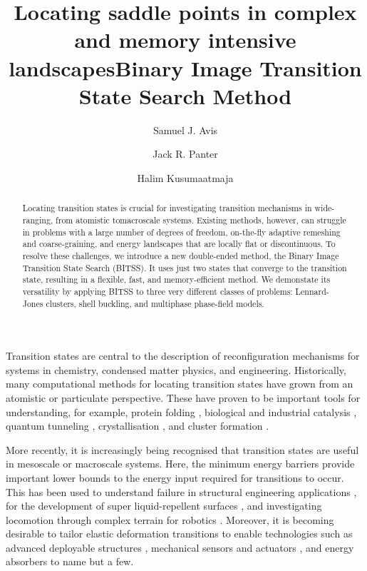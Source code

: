\documentclass[aps,prl,twocolumn,10pt,groupedaddress]{revtex4-2}
\begin{document}
\title{Locating saddle points in complex and memory intensive landscapes}
\title{Binary Image Transition State Search Method}
\author{Samuel J. Avis}
\author{Jack R. Panter}
\author{Halim Kusumaatmaja}

\begin{abstract}
  Locating transition states is crucial for investigating transition mechanisms in wide-ranging, from atomistic tomacroscale systems.
  Existing methods, however, can struggle in problems with a large number of degrees of freedom, on-the-fly adaptive remeshing and coarse-graining, and energy landscapes that are locally flat or discontinuous.
  To resolve these challenges, we introduce a new double-ended method, the Binary Image Transition State Search (BITSS).
  It uses just two states that converge to the transition state, resulting in a flexible, fast, and memory-efficient method.
  We demonstate its versatility by applying BITSS to three very different classes of problems: Lennard-Jones clusters, shell buckling, and multiphase phase-field models.
\end{abstract}

\maketitle


Transition states are central to the description of reconfiguration mechanisms for systems in chemistry, condensed matter physics, and engineering.
Historically, many computational methods for locating transition states have grown from an atomistic or particulate perspective.
These have proven to be important tools for understanding, for example, protein folding \cite{Bryngelson1995,Onuchic1997}, biological and industrial catalysis \cite{Boehr2006,Kerns2015,Guo2018a}, quantum tunneling \cite{Richardson2016,Vaillant2019}, crystallisation \cite{Richard2018}, and cluster formation \cite{Wales1998,Wales2012}.

More recently, it is increasingly being recognised that transition states are useful in mesoscale or macroscale systems.
Here, the minimum energy barriers provide important lower bounds to the energy input required for transitions to occur.
This has been used to understand failure in structural engineering applications \cite{Panter2019,Hutchinson2018}, for the development of super liquid-repellent surfaces \cite{Zhang2014,Panter2019b}, and investigating locomotion through complex terrain for robotics \cite{Othayoth2020}.
Moreover, it is becoming desirable to tailor elastic deformation transitions to enable technologies such as advanced deployable structures \cite{Filipov2015,Zhai2018}, mechanical sensors and actuators \cite{Bertoldi2017,Truby2016,Chi2022,Bonfanti2020}, and energy absorbers \cite{Shan2015,Giri2021} to name but a few.
\end{document}
